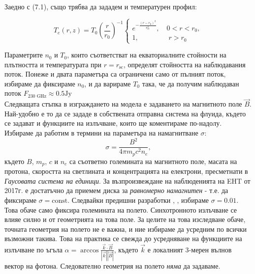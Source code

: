 Заедно с (7.1), също трябва да зададем и температурен профил:

\begin{equation}
	T_e(r,z) = T_0\left(\frac{r}{r_0}\right)^{-1}
	\begin{cases}
		e^{-\frac{(r-r_0)^2}{r^2_{\text{sc}}}},\quad 0 < r < r_0,\\
		1,\,\,\qquad\qquad r>r_0
	\end{cases}
\end{equation}

Параметрите $n_0$ и $T_0$, които съответстват на екваториалните стойности на плътността и температурата при $r = r_\text{sc}$, определят стойността на наблюдавания поток. Понеже и двата параметъра са ограничени само от пълният поток, избираме да фиксираме $n_0$, и да варираме $T_0$ така, че да получим наблюдаван поток $F_{\text{230 GHz}} \approx 0.5 \text{Jy}$\\

Следващата стъпка в изграждането на модела е задаването на магнитното поле $\vec{B}$. Най-удобно е то да се зададе в собствената отправна система на флуида, където се задават и функциите на излъчване, които ще коментираме по-надолу. Избираме да работим в термини на параметъра на намагнитване $\sigma$:
\begin{equation}
	\sigma = \frac{B^2}{4\pi m_pc^2n_e},
\end{equation}
където $B$, $m_p$, $c$ и $n_e$ са съответно големината на магнитното поле, масата на протона, скоростта на светлината и концентрацията на електрони, пресметнати в \emph{Гаусовата система на единици}. За възпроизвеждане на наблюденията на EHT от 2017г. е достатъчно да приемем диска за \emph{равномерно намагнитен} - т.е. да фиксираме $\sigma = \text{const}$. Следвайки предишни разработки \cite{KERR_SIM_PAPER}, \cite{Geometric_Modeling}, избираме $\sigma = 0.01$. Това обаче само фиксира големината на полето. Синхотронното излъчване се влияе силно и от геометрията на това поле. За целите на това изследване обаче, точната геометрия на полето не е важна, и ние избираме да усредним по всички възможни такива. Това на практика се свежда до усредняване на функциите на излъчване по ъгъла $\alpha = \arccos\frac{\vec{k}\cdot\vec{B}}{|\vec{k}||\vec{B}|}$, където $\vec{k}$ е локалният 3-мерен вълнов вектор на фотона. Следователно геометрия на полето \emph{няма} да задаваме.\\

